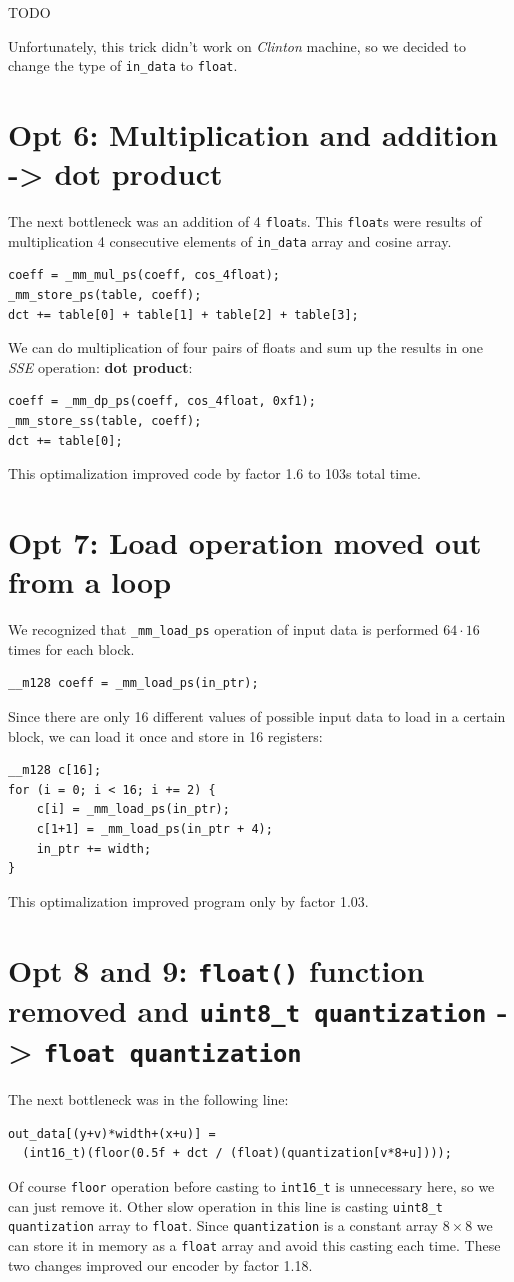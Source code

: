 \documentclass[11pt]{article}
\begin{document}
TODO

Unfortunately, this trick didn't work on \emph{Clinton} machine, 
so we decided to change the type of \texttt{in\_data} to \texttt{float}.

\section{Opt 6: Multiplication and addition -> dot product}
The next bottleneck was an addition of 4 \texttt{float}s.
This \texttt{float}s were results of multiplication 4 consecutive elements
of \texttt{in\_data} array and cosine array.
\begin{lstlisting}
coeff = _mm_mul_ps(coeff, cos_4float);
_mm_store_ps(table, coeff);
dct += table[0] + table[1] + table[2] + table[3];
\end{lstlisting}
We can do multiplication of four pairs of floats and sum up the results
in one \emph{SSE} operation: \textbf{dot product}:
\begin{lstlisting}
coeff = _mm_dp_ps(coeff, cos_4float, 0xf1);
_mm_store_ss(table, coeff);
dct += table[0];
\end{lstlisting}
This optimalization improved code by factor 1.6 to 103s total time.

\section{Opt 7: Load operation moved out from a loop}
We recognized that \texttt{\_mm\_load\_ps} operation of input data 
is performed $64 \cdot 16$ times for each block.
\begin{lstlisting}
__m128 coeff = _mm_load_ps(in_ptr);
\end{lstlisting}
Since there are only 16 different values of possible input data to load
in a certain block, we can load it once and store in 16 registers:
\begin{lstlisting}
__m128 c[16];
for (i = 0; i < 16; i += 2) {
    c[i] = _mm_load_ps(in_ptr);
    c[1+1] = _mm_load_ps(in_ptr + 4);
    in_ptr += width;
}
\end{lstlisting}
This optimalization improved program only by factor 1.03.

\section{Opt 8 and 9: \texttt{float()} function removed and \texttt{uint8\_t quantization} -> \texttt{float quantization}}
The next bottleneck was in the following line:
\begin{lstlisting}
out_data[(y+v)*width+(x+u)] = 
  (int16_t)(floor(0.5f + dct / (float)(quantization[v*8+u])));
\end{lstlisting}
Of course \texttt{floor} operation before casting to \texttt{int16\_t}
is unnecessary here, so we can just remove it.
Other slow operation in this line is casting \texttt{uint8\_t quantization} array to \texttt{float}.
Since \texttt{quantization} is a constant array $8 \times 8$ we can store it
in memory as a \texttt{float} array and avoid this casting each time.
These two changes improved our encoder by factor 1.18.
\end{document}
